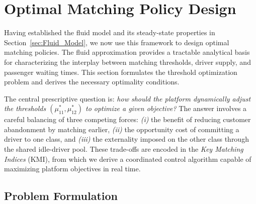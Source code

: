 \section{Optimal Matching Policy Design}\label{sec:matching_policies}

Having established the fluid model and its steady-state properties in Section~\ref{sec:Fluid_Model}, we now use this framework to design optimal matching policies.
The fluid approximation provides a tractable analytical basis for characterizing the interplay between matching thresholds, driver supply, and passenger waiting times.
This section formulates the threshold optimization problem and derives the necessary optimality conditions.

The central prescriptive question is: \emph{how should the platform dynamically adjust the thresholds $(\mu_{11}^*, \mu_{12}^*)$ to optimize a given objective?}
The answer involves a careful balancing of three competing forces: \emph{(i)} the benefit of reducing customer abandonment by matching earlier, \emph{(ii)} the opportunity cost of committing a driver to one class, and \emph{(iii)} the externality imposed on the other class through the shared idle-driver pool.
These trade-offs are encoded in the \emph{Key Matching Indices} (KMI), from which we derive a coordinated control algorithm capable of maximizing platform objectives in real time.

\subsection{Problem Formulation}
\label{subsec:problem_formulation}


